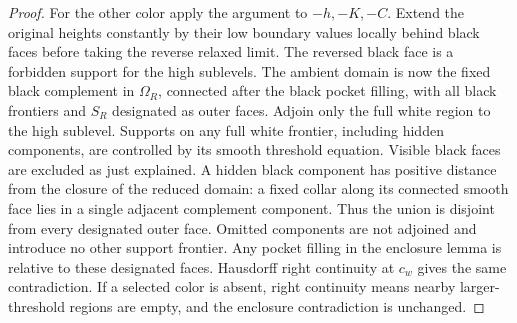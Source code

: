 \begin{proof}
For the other color apply the argument to $-h,-K,-C$.  Extend the
original heights constantly by their low boundary values locally
behind black faces before taking the reverse relaxed limit.
The reversed black face is a forbidden support for the high
sublevels.  The ambient domain is now the fixed black complement
in $\Omega_R$, connected after the black pocket filling, with all
black frontiers and $S_R$ designated as outer faces.  Adjoin only
the full white region to the high sublevel.  Supports on any full
white frontier, including hidden components, are controlled by its
smooth threshold equation.  Visible black faces are excluded as
just explained.  A hidden black component has positive distance
from the closure of the reduced domain: a fixed collar along its
connected smooth face lies in a single adjacent complement
component.  Thus the union is disjoint from every designated outer
face.  Omitted components are not adjoined and introduce no other
support frontier.  Any pocket filling in the enclosure lemma is
relative to these designated faces.  Hausdorff right continuity at
$c_w$ gives the same contradiction.  If a selected
color is absent, right continuity means nearby larger-threshold
regions are empty, and the enclosure contradiction is unchanged.
\end{proof}

